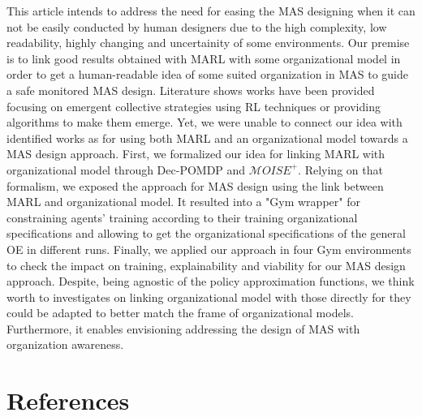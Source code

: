 \documentclass[runningheads]{llncs}
\begin{document}
This article intends to address the need for easing the MAS designing when it can not be easily conducted by human designers due to the high complexity, low readability, highly changing and uncertainity of some environments. Our premise is to link good results obtained with MARL with some organizational model in order to get a human-readable idea of some suited organization in MAS to guide a safe monitored MAS design. Literature shows works have been provided focusing on emergent collective strategies using RL techniques or providing algorithms to make them emerge. Yet, we were unable to connect our idea with identified works as for using both MARL and an organizational model towards a MAS design approach. First, we formalized our idea for linking MARL with organizational model through Dec-POMDP and $\mathcal{M}OISE^+$. Relying on that formalism, we exposed the approach for MAS design using the link between MARL and organizational model. It resulted into a "Gym wrapper" for constraining agents' training according to their training organizational specifications and allowing to get the organizational specifications of the general OE in different runs. Finally, we applied our approach in four Gym environments to check the impact on training, explainability and viability for our MAS design approach. Despite, being agnostic of the policy approximation functions, we think worth to investigates on linking organizational model with those directly for they could be adapted to better match the frame of organizational models. Furthermore, it enables envisioning addressing the design of MAS with organization awareness.


%
%
% 
% 
%
\section*{References}

% 



\end{document}
